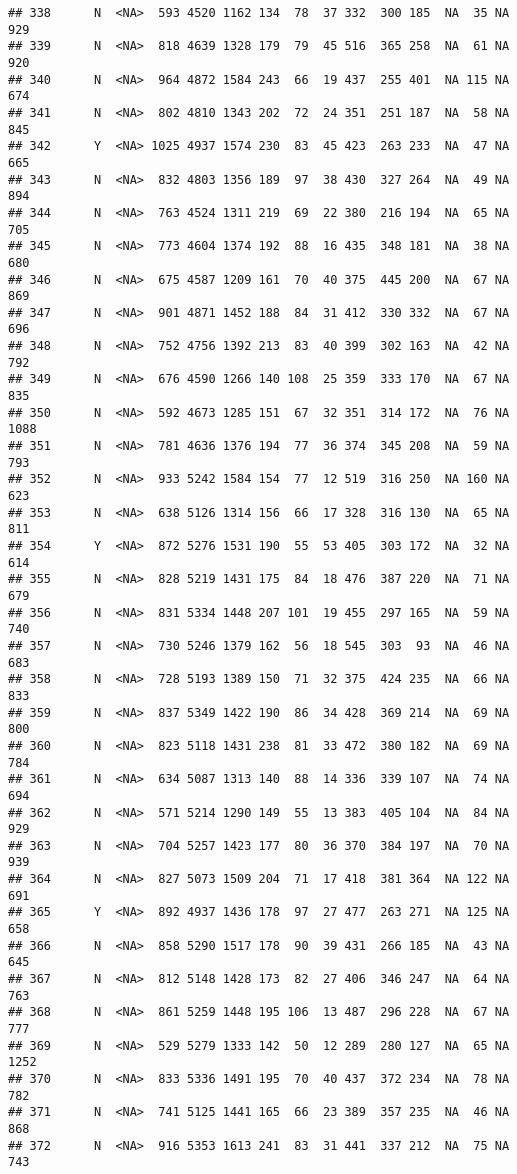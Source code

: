 \documentclass[]{article}
\begin{document}
\begin{verbatim}
## 338      N  <NA>  593 4520 1162 134  78  37 332  300 185  NA  35 NA  929
## 339      N  <NA>  818 4639 1328 179  79  45 516  365 258  NA  61 NA  920
## 340      N  <NA>  964 4872 1584 243  66  19 437  255 401  NA 115 NA  674
## 341      N  <NA>  802 4810 1343 202  72  24 351  251 187  NA  58 NA  845
## 342      Y  <NA> 1025 4937 1574 230  83  45 423  263 233  NA  47 NA  665
## 343      N  <NA>  832 4803 1356 189  97  38 430  327 264  NA  49 NA  894
## 344      N  <NA>  763 4524 1311 219  69  22 380  216 194  NA  65 NA  705
## 345      N  <NA>  773 4604 1374 192  88  16 435  348 181  NA  38 NA  680
## 346      N  <NA>  675 4587 1209 161  70  40 375  445 200  NA  67 NA  869
## 347      N  <NA>  901 4871 1452 188  84  31 412  330 332  NA  67 NA  696
## 348      N  <NA>  752 4756 1392 213  83  40 399  302 163  NA  42 NA  792
## 349      N  <NA>  676 4590 1266 140 108  25 359  333 170  NA  67 NA  835
## 350      N  <NA>  592 4673 1285 151  67  32 351  314 172  NA  76 NA 1088
## 351      N  <NA>  781 4636 1376 194  77  36 374  345 208  NA  59 NA  793
## 352      N  <NA>  933 5242 1584 154  77  12 519  316 250  NA 160 NA  623
## 353      N  <NA>  638 5126 1314 156  66  17 328  316 130  NA  65 NA  811
## 354      Y  <NA>  872 5276 1531 190  55  53 405  303 172  NA  32 NA  614
## 355      N  <NA>  828 5219 1431 175  84  18 476  387 220  NA  71 NA  679
## 356      N  <NA>  831 5334 1448 207 101  19 455  297 165  NA  59 NA  740
## 357      N  <NA>  730 5246 1379 162  56  18 545  303  93  NA  46 NA  683
## 358      N  <NA>  728 5193 1389 150  71  32 375  424 235  NA  66 NA  833
## 359      N  <NA>  837 5349 1422 190  86  34 428  369 214  NA  69 NA  800
## 360      N  <NA>  823 5118 1431 238  81  33 472  380 182  NA  69 NA  784
## 361      N  <NA>  634 5087 1313 140  88  14 336  339 107  NA  74 NA  694
## 362      N  <NA>  571 5214 1290 149  55  13 383  405 104  NA  84 NA  929
## 363      N  <NA>  704 5257 1423 177  80  36 370  384 197  NA  70 NA  939
## 364      N  <NA>  827 5073 1509 204  71  17 418  381 364  NA 122 NA  691
## 365      Y  <NA>  892 4937 1436 178  97  27 477  263 271  NA 125 NA  658
## 366      N  <NA>  858 5290 1517 178  90  39 431  266 185  NA  43 NA  645
## 367      N  <NA>  812 5148 1428 173  82  27 406  346 247  NA  64 NA  763
## 368      N  <NA>  861 5259 1448 195 106  13 487  296 228  NA  67 NA  777
## 369      N  <NA>  529 5279 1333 142  50  12 289  280 127  NA  65 NA 1252
## 370      N  <NA>  833 5336 1491 195  70  40 437  372 234  NA  78 NA  782
## 371      N  <NA>  741 5125 1441 165  66  23 389  357 235  NA  46 NA  868
## 372      N  <NA>  916 5353 1613 241  83  31 441  337 212  NA  75 NA  743

\end{verbatim}
\end{document}
